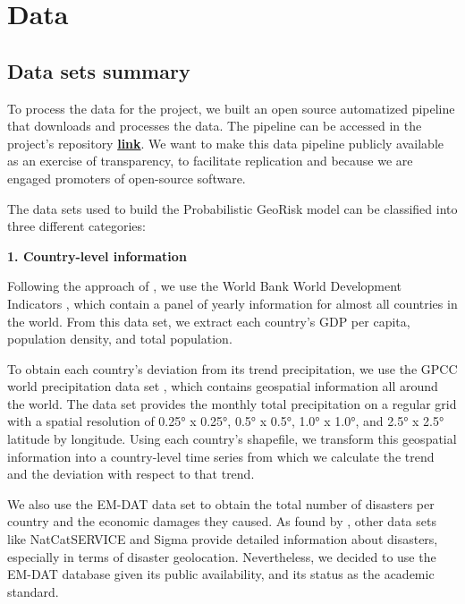 
\section{Data}
\label{sec:data}

\subsection{Data sets summary}

To process the data for the project, we built an open source automatized pipeline that downloads and processes the data. The pipeline can be accessed in the project's repository \href{https://github.com/jessegrabowski/laos-climate-change/tree/main/laos_gggi/data_functions}{\textbf{link}}. We want to make this data pipeline publicly available as an exercise of transparency, to facilitate replication and because we are engaged promoters of open-source software.

The data sets used to build the Probabilistic GeoRisk model can be classified into three different categories:

\textbf{1. Country-level information}

Following the approach of \citet{lopez_climate_2015}, we use the World Bank World Development Indicators \citep{worldbank_wdi_2024}, which contain a panel of yearly information for almost all countries in the world. From this data set, we extract each country's GDP per capita, population density, and total population.

To obtain each country's deviation from its trend precipitation, we use the GPCC world precipitation data set \citep{gpcc_2022}, which contains geospatial information all around the world. The data set provides the monthly total precipitation on a regular grid with a spatial resolution of 0.25° x 0.25°, 0.5° x 0.5°, 1.0° x 1.0°, and 2.5° x 2.5° latitude by longitude. Using each country's shapefile, we transform this geospatial information into a country-level time series from which we calculate the trend and the deviation with respect to that trend.

We also use the EM-DAT data set \citep{cred_emdat_2024} to obtain the total number of disasters per country and the economic damages they caused. As found by \citet{Botzen2019}, other data sets like NatCatSERVICE and Sigma provide detailed information about disasters, especially in terms of disaster geolocation. Nevertheless, we decided to use the EM-DAT database given its public availability, and its status as the academic standard.

